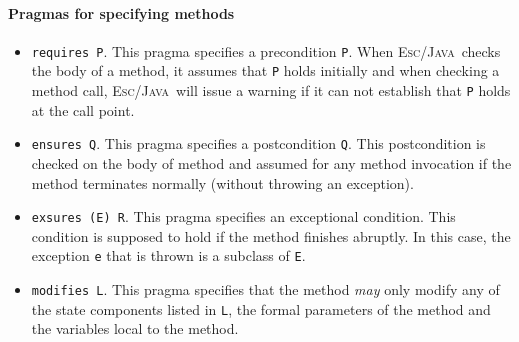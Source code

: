 \documentclass[a4paper]{llncs}
\newcommand{\escj}{\textsc{Esc/Java}}
\begin{document}
\paragraph{\bf Pragmas for specifying methods} 
\begin{itemize}
\item{\texttt{requires P}.} 
This pragma specifies a precondition {\tt P}. 
When \escj~checks the body of a
method, it assumes that \texttt{P} holds initially and when checking
a method call, \escj~will issue a warning if 
it can not establish that \texttt{P} holds at the call point. 
 
\item{\texttt{ensures Q}.} 
This pragma specifies a postcondition \texttt{Q}. This postcondition
is checked on the body of method and assumed for any method
invocation if the method terminates normally (without throwing an
exception).
 
\item{\texttt{exsures (E) R}.} 
This pragma specifies an exceptional condition. This condition is 
supposed to hold if the method finishes abruptly. In this case,
the exception \texttt{e} that is thrown is a subclass of \texttt{E}. 
 
\item{\texttt{modifies L}.} 
This pragma specifies that the method \emph{may} only modify any of 
the state components listed in \texttt{L}, the formal parameters of 
the method and the variables local to the method. 
\end{itemize}
 
 
 
\end{document}
